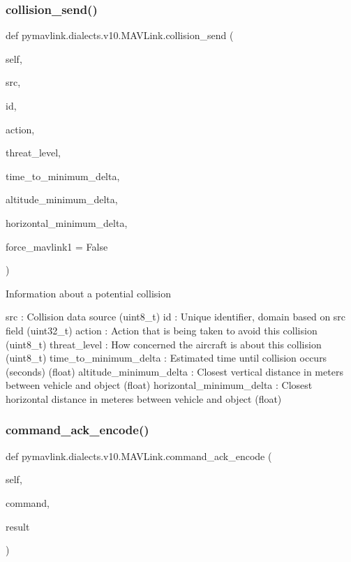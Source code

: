 \begin{DoxyVerb}
\begin{DoxyVerb}
\subsubsection{\texorpdfstring{collision\+\_\+send()}{collision\_send()}}
{\footnotesize\ttfamily def pymavlink.\+dialects.\+v10.\+M\+A\+V\+Link.\+collision\+\_\+send (\begin{DoxyParamCaption}\item[{}]{self,  }\item[{}]{src,  }\item[{}]{id,  }\item[{}]{action,  }\item[{}]{threat\+\_\+level,  }\item[{}]{time\+\_\+to\+\_\+minimum\+\_\+delta,  }\item[{}]{altitude\+\_\+minimum\+\_\+delta,  }\item[{}]{horizontal\+\_\+minimum\+\_\+delta,  }\item[{}]{force\+\_\+mavlink1 = {\ttfamily False} }\end{DoxyParamCaption})}

\begin{DoxyVerb}Information about a potential collision

src                       : Collision data source (uint8_t)
id                        : Unique identifier, domain based on src field (uint32_t)
action                    : Action that is being taken to avoid this collision (uint8_t)
threat_level              : How concerned the aircraft is about this collision (uint8_t)
time_to_minimum_delta        : Estimated time until collision occurs (seconds) (float)
altitude_minimum_delta        : Closest vertical distance in meters between vehicle and object (float)
horizontal_minimum_delta        : Closest horizontal distance in meteres between vehicle and object (float)\end{DoxyVerb}
 \mbox{\label{classpymavlink_1_1dialects_1_1v10_1_1MAVLink_a2b0f00937ec3ad188f3e7e8fdfeba758}} 
\subsubsection{\texorpdfstring{command\+\_\+ack\+\_\+encode()}{command\_ack\_encode()}}
{\footnotesize\ttfamily def pymavlink.\+dialects.\+v10.\+M\+A\+V\+Link.\+command\+\_\+ack\+\_\+encode (\begin{DoxyParamCaption}\item[{}]{self,  }\item[{}]{command,  }\item[{}]{result }\end{DoxyParamCaption})}


\end{DoxyVerb}
\end{DoxyVerb}
